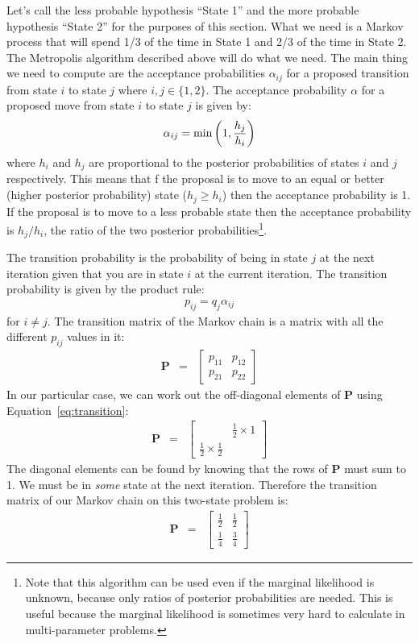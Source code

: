 Let's
call the less probable hypothesis ``State 1'' and the more probable hypothesis
``State 2'' for the purposes of this section.
What we need is a Markov process that will spend 1/3 of the time in State 1 and
2/3 of the time in State 2. The Metropolis algorithm described above will
do what we need. The main thing we need to compute are the acceptance probabilities
$\alpha_{ij}$ for a proposed transition from state $i$ to state $j$ where
$i, j \in \{1, 2\}$.
The acceptance probability $\alpha$ for a proposed move from state $i$ to
state $j$ is given by:
\begin{eqnarray}
\alpha_{ij} = \textnormal{min}\left(1, \frac{h_j}{h_i}\right)
\end{eqnarray}
where $h_i$ and $h_j$ are proportional to the posterior probabilities of
states $i$ and $j$ respectively. This means that f the proposal is to move
to an equal or better (higher posterior probability)
state ($h_j \geq h_i$) then the acceptance probability is 1.
If the proposal is to move to a less probable state then the acceptance probability
is $h_j/h_i$, the ratio of the two posterior probabilities\footnote{Note that
this algorithm can be used even if the marginal likelihood is unknown, because
only ratios of posterior probabilities are needed. This is useful because the
marginal likelihood is sometimes very hard to calculate in multi-parameter
problems.}.

The transition probability is the probability
of being in state $j$ at the next iteration given that you are in state $i$
at the current iteration. The transition probability is given by the product
rule:
\begin{eqnarray}
p_{ij} = q_j \alpha_{ij}\label{eq:transition}
\end{eqnarray}
for $i \neq j$.
The transition matrix of the Markov chain is a matrix with all the different
$p_{ij}$ values in it:
\begin{eqnarray}
\mathbf{P} &=&
\left[
\begin{array}{cc}
p_{11} & p_{12}\\
p_{21} & p_{22}
\end{array}
\right]
\end{eqnarray}
In our particular case, we can work out the off-diagonal elements of
$\mathbf{P}$ using Equation~\ref{eq:transition}:
\begin{eqnarray}
\mathbf{P}
&=&
\left[
\begin{array}{cc}
 & \frac{1}{2} \times 1\\
\frac{1}{2}\times\frac{1}{2} & 
\end{array}
\right]
\end{eqnarray}
The diagonal elements can be found by knowing that the rows of $\mathbf{P}$ must
sum to 1. We must be in {\it some} state at the next iteration. Therefore the
transition matrix of our Markov chain on this two-state problem is:
\begin{eqnarray}
\mathbf{P}
&=&
\left[
\begin{array}{cc}
\frac{1}{2} & \frac{1}{2}\\
\frac{1}{4} & \frac{3}{4}
\end{array}
\right]\label{eq:transition}
\end{eqnarray}

